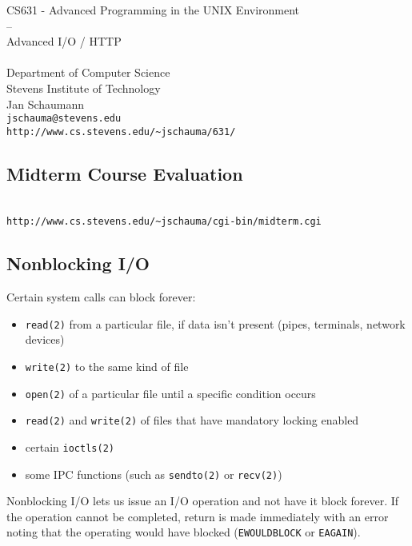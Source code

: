 \documentclass[xga]{xdvislides}
\begin{document}
\setfontphv

\lhead{\slidetitle}
\cfoot{\relax}
\rfoot{\Gray{\today}}

\vspace*{\fill}
\begin{center}
	\Hugesize
		CS631 - Advanced Programming in the UNIX Environment\\
		-- \\
		Advanced I/O / HTTP \\
	\hspace*{5mm}\blueline\\ [1em]
	\Normalsize
		Department of Computer Science\\
		Stevens Institute of Technology\\
		Jan Schaumann\\
		\verb+jschauma@stevens.edu+\\
		\verb+http://www.cs.stevens.edu/~jschauma/631/+
\end{center}
\vspace*{\fill}

\subsection{Midterm Course Evaluation}
\vspace*{\fill}
\\
\verb+http://www.cs.stevens.edu/~jschauma/cgi-bin/midterm.cgi+
\vspace*{\fill}

\subsection{Nonblocking I/O}
Certain system calls can block forever:
\begin{itemize}
	\item {\tt read(2)} from a particular file, if data isn't present (pipes,
		terminals, network devices)
	\item {\tt write(2)} to the same kind of file
	\item {\tt open(2)} of a particular file until a specific condition occurs
	\item {\tt read(2)} and {\tt write(2)} of files that have mandatory
		locking enabled
	\item certain {\tt ioctls(2)}
	\item some IPC functions (such as {\tt sendto(2)} or {\tt recv(2)})
\end{itemize}
\vspace{.25in}
Nonblocking I/O lets us issue an I/O operation and not have it block forever.
If the operation cannot be completed, return is made immediately with an error
noting that the operating would have blocked ({\tt EWOULDBLOCK} or {\tt EAGAIN}).
\end{document}
